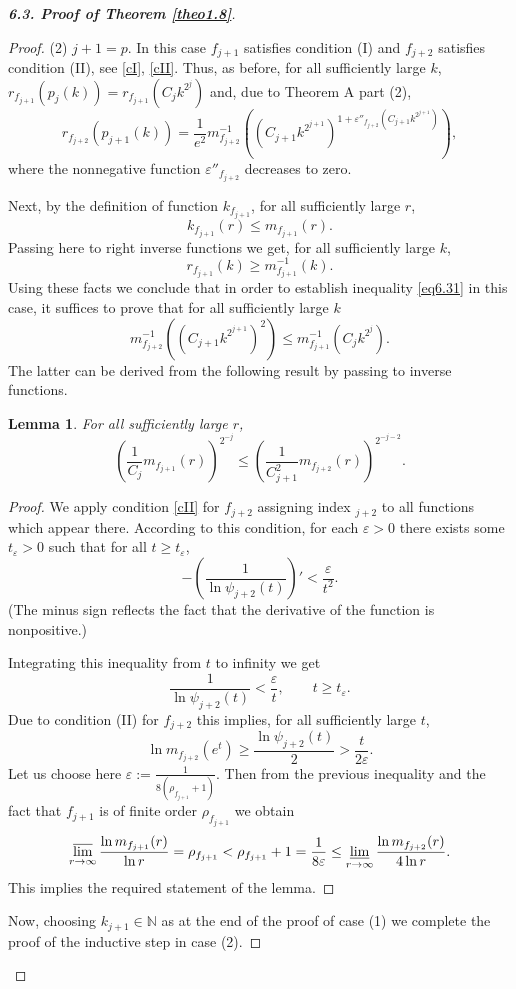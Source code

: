\documentclass[11pt, oneside]{amsart}
\newtheorem{Lm}[Th]{Lemma}
\begin{document}
\begin{proof}[{\bf 6.3. Proof of Theorem \ref{theo1.8}}]
\begin{proof}
(2) $j+1=p$. In this case $f_{j+1}$ satisfies condition (I)  and $f_{j+2}$ satisfies condition (II), see \eqref{cI}, \eqref{cII}. Thus, as before, for all sufficiently large $k$,
$r_{f_{j+1}}(p_{j}(k))=r_{f_{j+1}}(C_j k^{2^j})$  and, due to Theorem A part (2),
\[
r_{f_{j+2}}(p_{j+1}(k))=\frac{1}{e^2}m_{f_{j+2}}^{-1}\left(\left(C_{j+1} k^{2^{j+1}}\right)^{1+\varepsilon''_{f_{j+2}}(C_{j+1} k^{2^{j+1}})}\right),
\]
where the nonnegative function $\varepsilon''_{f_{j+2}}$ decreases to zero.

Next, by the definition of function $k_{f_{j+1}}$, for all sufficiently large $r$,
\[
k_{f_{j+1}}(r)\le m_{f_{j+1}}(r).
\]
Passing here to right inverse functions we get, for all sufficiently large $k$,
\[
r_{f_{j+1}}(k)\ge m_{f_{j+1}}^{-1}(k).
\]
Using these facts we conclude that in order to establish inequality \eqref{eq6.31} in this case, it suffices to prove that for all sufficiently large $k$
\[
m_{f_{j+2}}^{-1}\left(\left(C_{j+1} k^{2^{j+1}}\right)^{2}\right)\le m_{f_{j+1}}^{-1}(C_j k^{2^j}).
\]
The latter can be derived from the following result by passing to inverse functions.
\begin{Lm}\label{lem6.5}
For all sufficiently large $r$,
\[
\left(\frac{1}{C_j}m_{f_{j+1}}(r)\right)^{2^{-j}}\le \left(\frac{1}{C_{j+1}^2}m_{f_{j+2}}(r)\right)^{2^{-j-2}}.
\]
\end{Lm}
\begin{proof}
We apply condition \eqref{cII} for $f_{j+2}$ assigning index $_{j+2}$ to all functions which appear there. According  to this condition, for each $\varepsilon>0$ there exists some $t_\varepsilon>0$ such that for all $t\ge t_{\varepsilon}$,
\[
-\left(\frac{1}{\ln\psi_{j+2}(t)}\right)'<\frac{\varepsilon}{t^2}.
\]
(The minus sign reflects the fact that the derivative of the function is nonpositive.)
 
Integrating this inequality from $t$ to infinity we get
\[
\frac{1}{\ln\psi_{j+2}(t)}<\frac{\varepsilon}{t},\qquad t\ge t_\varepsilon .
\]
Due to condition (II) for $f_{j+2}$ this implies, for all sufficiently large $t$,
\[
\ln m_{f_{j+2}}(e^t)\ge \frac{\ln\psi_{j+2}(t)}{2}>\frac{t}{2\varepsilon}.
\]
Let us choose here $\varepsilon:=\frac{1}{8(\rho_{f_{j+1}}+1)}$.
Then from the previous inequality and the fact that $f_{j+1}$ is of finite order $\rho_{f_{j+1}}$ we obtain
\[
\varlimsup_{r\rightarrow\infty}\frac{\ln m_{f_{j+1}}(r)}{\ln r}=\rho_{f_{j+1}}<\rho_{f_{j+1}}+1=\frac{1}{8\varepsilon}\le
\varliminf_{r\rightarrow\infty}\frac{\ln m_{f_{j+2}}(r)}{4\ln r}.
\]
This implies the required statement of the lemma.
 \end{proof}
 Now, choosing $k_{j+1}\in\mathbb N$ as at the end of the proof of case (1) we complete the proof of the inductive step in case (2).\smallskip


\end{proof}
\end{proof}
\end{document}
